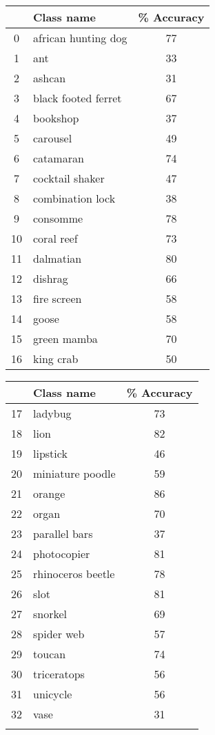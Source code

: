 \documentclass{article}
\begin{document}
\begin{table} [H]
\begin{minipage}{0.5\textwidth}
\begin{tabular}{c|lc}
 & \textbf{Class name} & \textbf{\% Accuracy} \\
\hline
    0 & african hunting dog  &  77 \\
    1  &  ant  &  33 \\
    2  &  ashcan  &  31 \\
    3  &  black footed ferret  &  67 \\
    4  &  bookshop  &  37 \\
    5  &  carousel  &  49 \\
    6  &  catamaran  &  74 \\
    7  &  cocktail shaker  &  47 \\
    8  &  combination lock  &  38 \\
    9  &  consomme  &  78 \\
    10  &  coral reef  &  73 \\
    11  &  dalmatian  &  80 \\
    12  &  dishrag  &  66 \\
    13  &  fire screen  &  58 \\
    14  &  goose  &  58 \\
    15  &  green mamba  &  70 \\
    16  &  king crab  &  50 \\

\end{tabular}

\end{minipage} \hfill
\begin{minipage}{0.5\textwidth}
\begin{tabular}{c|lc}
 & \textbf{Class name} & \textbf{\% Accuracy} \\
\hline
    17  &  ladybug  &  73 \\
    18  &  lion  &  82 \\
    19  &  lipstick  &  46 \\
    20  &  miniature poodle  &  59 \\
    21  &  orange  &  86 \\
    22  &  organ  &  70 \\
    23  &  parallel bars  &  37 \\
    24  &  photocopier  &  81 \\
    25  &  rhinoceros beetle  &  78 \\
    26  &  slot  &  81 \\
    27  &  snorkel  &  69 \\
    28  &  spider web  &  57 \\
    29  &  toucan  &  74 \\
    30  &  triceratops  &  56 \\
    31  &  unicycle  &  56 \\
    32  &  vase  &  31 \\
     &  &   \\
    

\end{tabular}
\end{minipage}
\end{table}
\end{document}
